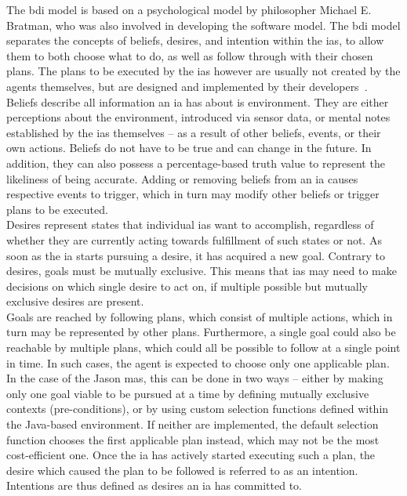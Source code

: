 \documentclass[draft,final]{vutinfth} %
\begin{document}
The \gls{bdi} model is based on a psychological model by philosopher Michael E. Bratman, who was also involved in developing the software model. 
The \gls{bdi} model separates the concepts of beliefs, desires, and intention within the \glspl{ia}, to allow them to both choose what to do, as well as follow through with their chosen plans. 
The plans to be executed by the \glspl{ia} however are usually not created by the agents themselves, but are designed and implemented by their developers~\cite{rao1996agentspeak}. \\
Beliefs describe all information an \gls{ia} has about is environment. 
They are either perceptions about the environment, introduced via sensor data, or mental notes established by the \glspl{ia} themselves – as a result of other beliefs, events, or their own actions. 
Beliefs do not have to be true and can change in the future. 
In addition, they can also possess a percentage-based truth value to represent the likeliness of being accurate. 
Adding or removing beliefs from an \gls{ia} causes respective events to trigger, which in turn may modify other beliefs or trigger plans to be executed. \\
Desires represent states that individual \glspl{ia} want to accomplish, regardless of whether they are currently acting towards fulfillment of such states or not. 
As soon as the \gls{ia} starts pursuing a desire, it has acquired a new goal. 
Contrary to desires, goals must be mutually exclusive. 
This means that \glspl{ia} may need to make decisions on which single desire to act on, if multiple possible but mutually exclusive desires are present. \\
Goals are reached by following plans, which consist of multiple actions, which in turn may be represented by other plans. 
Furthermore, a single goal could also be reachable by multiple plans, which could all be possible to follow at a single point in time. 
In such cases, the agent is expected to choose only one applicable plan. 
In the case of the Jason \gls{mas}, this can be done in two ways – either by making only one goal viable to be pursued at a time by defining mutually exclusive contexts (pre-conditions), or by using custom selection functions defined within the Java-based environment. 
If neither are implemented, the default selection function chooses the first applicable plan instead, which may not be the most cost-efficient one. 
Once the \gls{ia} has actively started executing such a plan, the desire which caused the plan to be followed is referred to as an intention. Intentions are thus defined as desires an \gls{ia} has committed to.  
\end{document}

